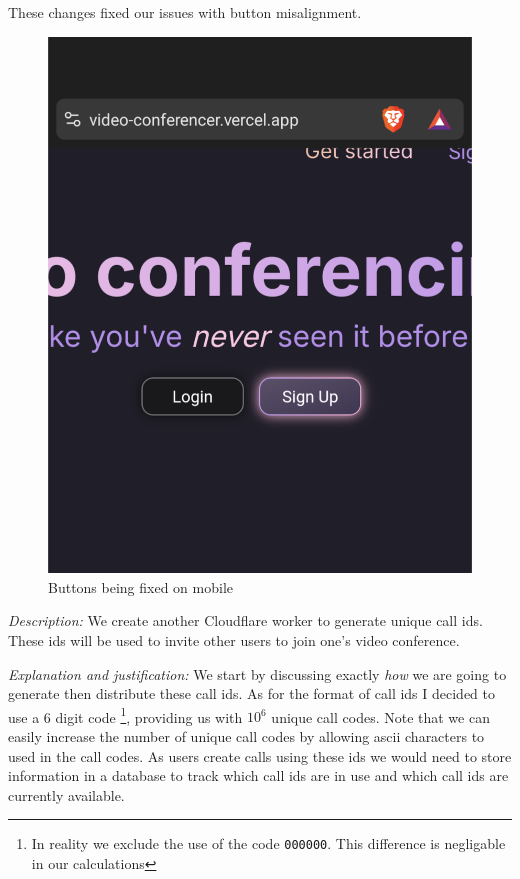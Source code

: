 These changes fixed our issues with button misalignment.

\begin{figure}[H]
\centering

\includegraphics[scale=0.2]{Images/Buttons_aligned.png}

\caption{Buttons being fixed on mobile}
\end{figure}

\textit{Description:} We create another Cloudflare worker to 
generate unique call ids. These ids will be used to invite 
other users to join one's video conference. \\ \vspace{0.2cm}

\textit{Explanation and justification:} We start by discussing
exactly \textit{how} we are going to generate then distribute 
these call ids. As for the format of call ids I decided to 
use a 6 digit code \footnote{In reality we exclude the use 
of the code \texttt{000000}. This difference is negligable
in our calculations}, providing us with $10^6$ unique call 
codes. Note that we can easily increase the number of unique 
call codes by allowing ascii characters to used in the call 
codes. As users create calls using these ids we would need to
store information in a database to track which call ids are 
in use and which call ids are currently available. 
\\ \vspace{0.2cm}

